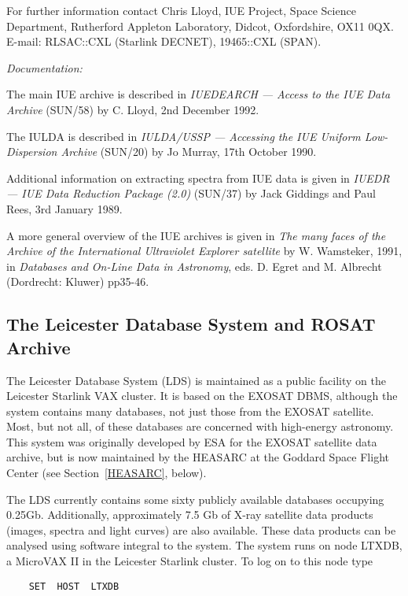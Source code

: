 \documentclass[twoside,11pt]{article}
\newcommand{\xref}[3]{#1}
\newcommand{\xlabel}[1]{}
\begin{document}
For further information contact Chris Lloyd, IUE Project, Space Science 
Department, Rutherford Appleton Laboratory, Didcot, Oxfordshire, OX11 
0QX. E-mail: RLSAC::CXL (Starlink DECNET), 19465::CXL (SPAN).

{\it Documentation:}

The main IUE archive is described in {\it IUEDEARCH --- Access to the
IUE Data Archive}
(\xref{SUN/58}{sun58}{}) by C. Lloyd, 2nd December 1992.

The IULDA is described in {\it IULDA/USSP --- Accessing the IUE Uniform
Low-Dispersion Archive} (\xref{SUN/20}{sun20}{}) by Jo Murray,
17th October 1990.

Additional information on extracting spectra from IUE data is given in
{\it IUEDR --- IUE Data Reduction Package (2.0)}
(\xref{SUN/37}{sun37}{}) by Jack 
Giddings and Paul Rees, 3rd January 1989.

A more general overview of the IUE archives is given in {\it The many
faces of the Archive of the International Ultraviolet Explorer 
satellite} by W. Wamsteker, 1991, in {\it Databases and On-Line Data 
in Astronomy}, eds. D. Egret and M. Albrecht (Dordrecht: Kluwer) 
pp35-46.

\subsection{The Leicester Database System and ROSAT Archive
\xlabel{the_leicester_database_system_and_rosat_archive}\label{LEICS}}

The Leicester Database System (LDS) is maintained as a public facility 
on the Leicester Starlink VAX cluster. It is based on the EXOSAT DBMS, 
although the system contains many databases, not just those from the 
EXOSAT satellite. Most, but not all, of these databases are concerned 
with high-energy astronomy. This system was originally developed by ESA
for the EXOSAT satellite data archive, but is now maintained by the 
HEASARC at the Goddard Space Flight Center (see Section~\ref{HEASARC}, 
below).

The LDS currently contains some sixty publicly available databases 
occupying 0.25Gb. Additionally, approximately 7.5 Gb of X-ray satellite 
data products (images, spectra and light curves) are also available. 
These data products can be analysed using software integral to the 
system. The system runs on node LTXDB, a MicroVAX II in the Leicester 
Starlink cluster. To log on to this node type

\begin{verbatim}
    SET  HOST  LTXDB
\end{verbatim}
\end{document}
